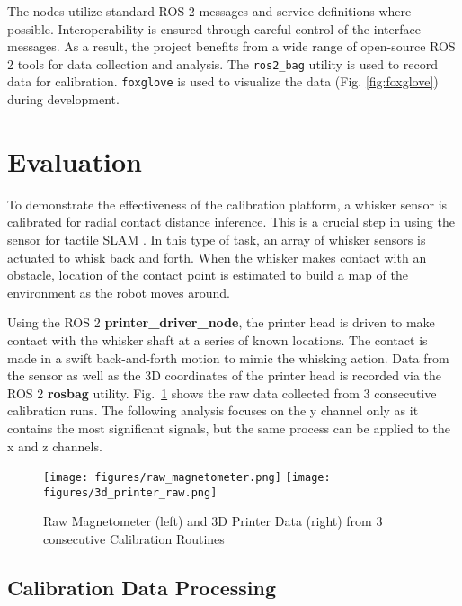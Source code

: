 \documentclass[runningheads]{llncs}
\begin{document}
The nodes utilize standard ROS 2 messages and service definitions where possible. Interoperability is ensured through careful control of the interface messages. As a result, the project benefits from a wide range of open-source ROS 2 tools for data collection and analysis. The \verb|ros2_bag| utility is used to record data for calibration. \verb|foxglove| is used to visualize the data (Fig. \ref{fig:foxglove}) during development.

\section{Evaluation}

To demonstrate the effectiveness of the calibration platform, a whisker sensor is calibrated for radial contact distance inference. This is a crucial step in using the sensor for tactile SLAM \cite{pearsonSimultaneousLocalisationMapping2013, leporaNaiveBayesNovelty2010}. In this type of task, an array of whisker sensors is actuated to whisk back and forth. When the whisker makes contact with an obstacle, location of the contact point is estimated to build a map of the environment as the robot moves around.

Using the ROS 2 \textbf{printer\_driver\_node}, the printer head is driven to make contact with the whisker shaft at a series of known locations. The contact is made in a swift back-and-forth motion to mimic the whisking action. Data from the sensor as well as the 3D coordinates of the printer head is recorded via the ROS 2 \textbf{rosbag} utility. Fig.~\ref{fig:calibration_routine} shows the raw data collected from 3 consecutive calibration runs. The following analysis focuses on the y channel only as it contains the most significant signals, but the same process can be applied to the x and z channels.

\begin{figure}
    \centering
    \texttt{[image: figures/raw\_magnetometer.png]}
    \hspace{1pt}
    \texttt{[image: figures/3d\_printer\_raw.png]}
    \caption{Raw Magnetometer (left) and 3D Printer Data (right) from 3 consecutive Calibration Routines}
    \label{fig:calibration_routine}
    \vspace{-10pt}
\end{figure}


\subsection{Calibration Data Processing}\label{sec:calibration_data_analysis}
\end{document}
